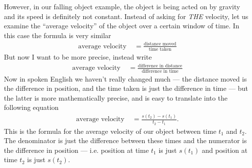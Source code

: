 However, in our falling object example, the object is being acted on by
gravity and its speed is definitely not constant. Instead of asking for
\emph{THE} velocity, let us examine the ``average velocity'' of the object over
a certain window of time. In this case the formula is very similar
\begin{align*}
  \text{average velocity } &= \frac{\text{distance moved}}{\text{time taken}}
\end{align*}
But now I want to be more precise, instead write
\begin{align*}
  \text{average velocity } &= \frac{\text{difference in
distance}}{\text{difference in time}}
\end{align*}
Now in spoken English we haven't really changed much --- the distance moved is
the difference in position, and the time taken is just the difference in time
--- but the latter is more mathematically precise, and is easy to translate
into the following equation
\begin{align*}
  \text{average velocity } &= \frac{s(t_2) - s(t_1)}{t_2 - t_1}.
\end{align*}
This is the formula for the average velocity of our object between time $t_1$
and $t_2$. The denominator is just the difference between these times and the
numerator is the difference in position --- i.e. position at time $t_1$ is just
$s(t_1)$ and position at time $t_2$ is just $s(t_2)$.


